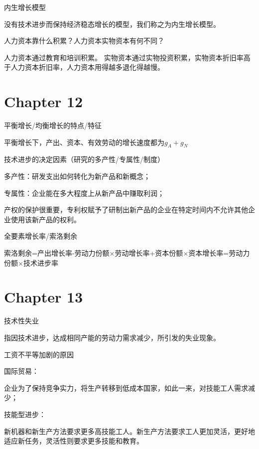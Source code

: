 \documentclass{article}
\begin{document}
\hspace*{\fill}

内生增长模型

没有技术进步而保持经济稳态增长的模型，我们称之为内生增长模型。

\hspace*{\fill}

人力资本靠什么积累？人力资本实物资本有何不同？

人力资本通过教育和培训积累。
实物资本通过实物投资积累，实物资本折旧率高于人力资本折旧率，人力资本用得越多退化得越慢。

\section{Chapter 12}

平衡增长/均衡增长的特点/特征

平衡增长下，产出、资本、有效劳动的增长速度都为$ g_A+g_N $

\hspace*{\fill}

技术进步的决定因素（研究的多产性/专属性/制度）

多产性：研发支出如何转化为新产品和新概念；

专属性：企业能在多大程度上从新产品中赚取利润；

产权的保护很重要，专利权赋予了研制出新产品的企业在特定时间内不允许其他企业使用该新产品的权利。

\hspace*{\fill}

全要素增长率/索洛剩余

索洛剩余=产出增长率-劳动力份额$ \times $劳动增长率+资本份额$ \times $资本增长率=劳动力份额$ \times $技术进步率

\section{Chapter 13}

技术性失业

指因技术进步，达成相同产能的劳动力需求减少，所引发的失业现象。

\hspace*{\fill}

工资不平等加剧的原因

国际贸易：

企业为了保持竞争实力，将生产转移到低成本国家，如此一来，对技能工人需求减少；

技能型进步：

新机器和新生产方法要求更多高技能工人。新生产方法要求工人更加灵活，更好地适应新任务，灵活性则要求更多技能和教育。
\end{document}
